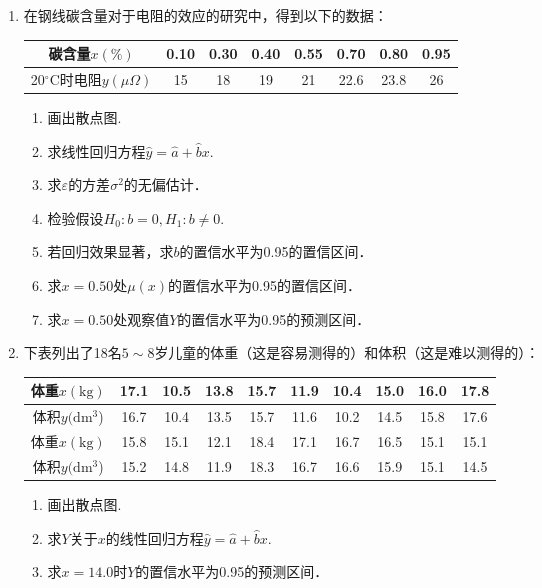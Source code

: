 \documentclass[10pt,a4paper]{article}
\begin{document}
\begin{enumerate}
    \item 在钢线碳含量对于电阻的效应的研究中，得到以下的数据：
    \renewcommand{\arraystretch}{1.3}
    \begin{table}[H]\centering
        \begin{tabular}{c|ccccccc}
        \hline
        碳含量$x(\%)$  & 0.10 & 0.30 & 0.40 & 0.55 & 0.70 & 0.80 & 0.95 \\ \hline
        20$^{\circ}$C时电阻$y(\mu\Omega)$ & 15   & 18   & 19   & 21   & 22.6 & 23.8 & 26   \\ \hline
        \end{tabular}
    \end{table}
    \renewcommand{\arraystretch}{1.0}
    \begin{enumerate}
        \item 画出散点图.
        \item 求线性回归方程$\hat{y}=\hat{a}+\hat{b}x$.
        \item 求$\varepsilon$的方差$\sigma^2$的无偏估计．
        \item 检验假设$H_0:b=0,H_1:b\neq 0$.
        \item 若回归效果显著，求$b$的置信水平为0.95的置信区间．
        \item 求$x=0.50$处$\mu(x)$的置信水平为0.95的置信区间．
        \item 求$x=0.50$处观察值$Y$的置信水平为0.95的预测区间．
    \end{enumerate}


    \item 下表列出了18名$5\sim 8$岁儿童的体重（这是容易测得的）和体积（这是难以测得的）：
    \renewcommand{\arraystretch}{1.3}
    \begin{table}[H]\centering
        \begin{tabular}{c|ccccccccc}
        \hline
        体重$x(\mathrm{kg})$            & 17.1 & 10.5 & 13.8 & 15.7 & 11.9 & 10.4 & 15.0 & 16.0 & 17.8 \\ \hline
        体积$y(\mathrm{dm^3}$) & 16.7 & 10.4 & 13.5 & 15.7 & 11.6 & 10.2 & 14.5 & 15.8 & 17.6 \\ \hline
        体重$x(\mathrm{kg})$           & 15.8 & 15.1 & 12.1 & 18.4 & 17.1 & 16.7 & 16.5 & 15.1 & 15.1 \\ \hline
        体积$y(\mathrm{dm^3}$) & 15.2 & 14.8 & 11.9 & 18.3 & 16.7 & 16.6 & 15.9 & 15.1 & 14.5 \\ \hline
        \end{tabular}
    \end{table}
    \renewcommand{\arraystretch}{1.0}
    \begin{enumerate}
        \item 画出散点图.
        \item 求$Y$关于$x$的线性回归方程$\hat{y}=\hat{a}+\hat{b}x$.
        \item 求$x=14.0$时$Y$的置信水平为0.95的预测区间．
    \end{enumerate}






\end{enumerate}
\end{document}
